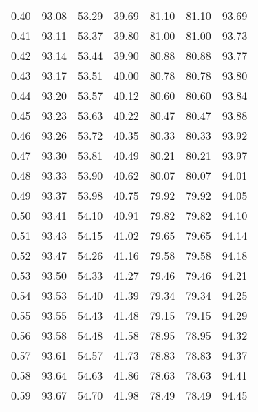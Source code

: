 \begin{tabular}{|c|c|c|c|c|c|c|}
      0.40 &     93.08 &     53.29 &      39.69 &   81.10 &      81.10 &         93.69 \\
      0.41 &     93.11 &     53.37 &      39.80 &   81.00 &      81.00 &         93.73 \\
      0.42 &     93.14 &     53.44 &      39.90 &   80.88 &      80.88 &         93.77 \\
      0.43 &     93.17 &     53.51 &      40.00 &   80.78 &      80.78 &         93.80 \\
      0.44 &     93.20 &     53.57 &      40.12 &   80.60 &      80.60 &         93.84 \\
      0.45 &     93.23 &     53.63 &      40.22 &   80.47 &      80.47 &         93.88 \\
      0.46 &     93.26 &     53.72 &      40.35 &   80.33 &      80.33 &         93.92 \\
      0.47 &     93.30 &     53.81 &      40.49 &   80.21 &      80.21 &         93.97 \\
      0.48 &     93.33 &     53.90 &      40.62 &   80.07 &      80.07 &         94.01 \\
      0.49 &     93.37 &     53.98 &      40.75 &   79.92 &      79.92 &         94.05 \\
      0.50 &     93.41 &     54.10 &      40.91 &   79.82 &      79.82 &         94.10 \\
      0.51 &     93.43 &     54.15 &      41.02 &   79.65 &      79.65 &         94.14 \\
      0.52 &     93.47 &     54.26 &      41.16 &   79.58 &      79.58 &         94.18 \\
      0.53 &     93.50 &     54.33 &      41.27 &   79.46 &      79.46 &         94.21 \\
      0.54 &     93.53 &     54.40 &      41.39 &   79.34 &      79.34 &         94.25 \\
      0.55 &     93.55 &     54.43 &      41.48 &   79.15 &      79.15 &         94.29 \\
      0.56 &     93.58 &     54.48 &      41.58 &   78.95 &      78.95 &         94.32 \\
      0.57 &     93.61 &     54.57 &      41.73 &   78.83 &      78.83 &         94.37 \\
      0.58 &     93.64 &     54.63 &      41.86 &   78.63 &      78.63 &         94.41 \\
      0.59 &     93.67 &     54.70 &      41.98 &   78.49 &      78.49 &         94.45 \\

\end{tabular}
